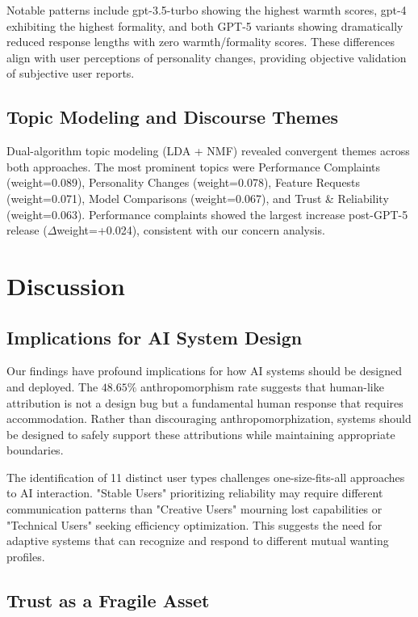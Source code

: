 \documentclass{article}
\begin{document}
Notable patterns include gpt-3.5-turbo showing the highest warmth scores, gpt-4 exhibiting the highest formality, and both GPT-5 variants showing dramatically reduced response lengths with zero warmth/formality scores. These differences align with user perceptions of personality changes, providing objective validation of subjective user reports.

\subsection{Topic Modeling and Discourse Themes}

Dual-algorithm topic modeling (LDA + NMF) revealed convergent themes across both approaches. The most prominent topics were Performance Complaints (weight=0.089), Personality Changes (weight=0.078), Feature Requests (weight=0.071), Model Comparisons (weight=0.067), and Trust \& Reliability (weight=0.063). Performance complaints showed the largest increase post-GPT-5 release ($\Delta$weight=+0.024), consistent with our concern analysis.

\section{Discussion}

\subsection{Implications for AI System Design}

Our findings have profound implications for how AI systems should be designed and deployed. The $48.65\%$ anthropomorphism rate suggests that human-like attribution is not a design bug but a fundamental human response that requires accommodation. Rather than discouraging anthropomorphization, systems should be designed to safely support these attributions while maintaining appropriate boundaries.

The identification of 11 distinct user types challenges one-size-fits-all approaches to AI interaction. "Stable Users" prioritizing reliability may require different communication patterns than "Creative Users" mourning lost capabilities or "Technical Users" seeking efficiency optimization. This suggests the need for adaptive systems that can recognize and respond to different mutual wanting profiles.

\subsection{Trust as a Fragile Asset}
\end{document}
